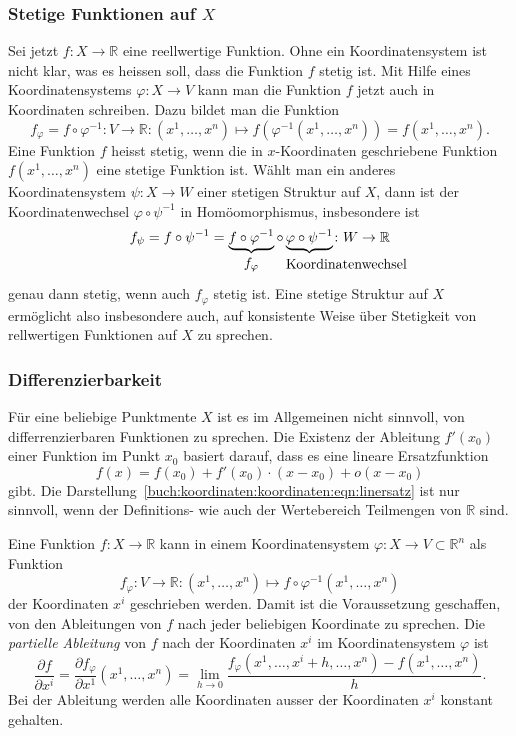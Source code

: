\subsubsection{Stetige Funktionen auf $X$}
Sei jetzt $f\colon X\to\mathbb{R}$ eine reellwertige Funktion.
Ohne ein Koordinatensystem ist nicht klar, was es heissen soll, dass die
Funktion $f$ stetig ist.
Mit Hilfe eines Koordinatensystems $\varphi\colon X\to V$ kann man die
Funktion $f$ jetzt auch in Koordinaten schreiben.
Dazu bildet man die Funktion
\[
f_\varphi
=
f\circ \varphi^{-1}
\colon
V
\to
\mathbb{R}
:
(x^1,\dots,x^n)
\mapsto
f(\varphi^{-1}(x^1,\dots,x^n))
=
f(x^1,\dots,x^n).
\]
Eine Funktion $f$ heisst stetig, wenn die in $x$-Koordinaten geschriebene
Funktion $f(x^1,\dots,x^n)$ eine stetige Funktion ist.
Wählt man ein anderes Koordinatensystem $\psi\colon X\to W$ einer
stetigen Struktur auf $X$, dann ist der Koordinatenwechsel
$\varphi\circ\psi^{-1}$ in Homöomorphismus, insbesondere ist 
\[
f_\psi
=
f\circ\psi^{-1}
=
\underbrace{f\circ\varphi^{-1}}_{\displaystyle f_\varphi\mathstrut}
\circ
\underbrace{\varphi\circ\psi^{-1}}_{\displaystyle
\hbox to6pt{\rlap{\text{Koordinatenwechsel\strut}}\hfill}}
\colon
W\to \mathbb{R}
\]
genau dann stetig, wenn auch $f_\varphi$ stetig ist.
Eine stetige Struktur auf $X$ ermöglicht also insbesondere auch,
auf konsistente Weise über Stetigkeit von rellwertigen Funktionen
auf $X$ zu sprechen.

%
%
\subsubsection{Differenzierbarkeit}
Für eine beliebige Punktmente $X$ ist es im Allgemeinen nicht sinnvoll,
von differrenzierbaren Funktionen zu sprechen.
Die Existenz der Ableitung $f'(x_0)$ einer Funktion im Punkt $x_0$
basiert darauf, dass es eine lineare Ersatzfunktion
\begin{equation}
f(x) = f(x_0) + f'(x_0)\cdot (x-x_0)+o(x-x_0)
\label{buch:koordinaten:koordinaten:eqn:linersatz}
\end{equation}
gibt.
Die Darstellung~\eqref{buch:koordinaten:koordinaten:eqn:linersatz}
ist nur sinnvoll, wenn der Definitions- wie auch der Wertebereich
Teilmengen von $\mathbb{R}$ sind.

Eine Funktion $f\colon X\to \mathbb{R}$ kann in einem Koordinatensystem
$\varphi\colon X\to V\subset\mathbb{R}^n$ als Funktion
\[
f_\varphi
\colon
V\to\mathbb{R}
:
(x^1,\dots,x^n)
\mapsto
f\circ\varphi^{-1}(x^1,\dots,x^n)
\]
der Koordinaten $x^i$ geschrieben werden.
Damit ist die Voraussetzung geschaffen, von den Ableitungen von $f$
nach jeder beliebigen Koordinate zu sprechen.
Die {\em partielle Ableitung} von $f$ nach der Koordinaten $x^i$ im
Koordinatensystem $\varphi$ ist
\begin{equation}
\frac{\partial f}{\partial x^i}
=
\frac{\partial f_\varphi}{\partial x^1}(x^1,\dots,x^n)
=
\lim_{h\to 0}
\frac{f_\varphi(x^1,\dots,x^i+h,\dots, x^n)-f(x^1,\dots,x^n)}{h}.
\label{buch:koordinaten:koordinaten:eqn:partabl}
\end{equation}
Bei der Ableitung werden alle Koordinaten ausser der Koordinaten $x^i$
konstant gehalten.

